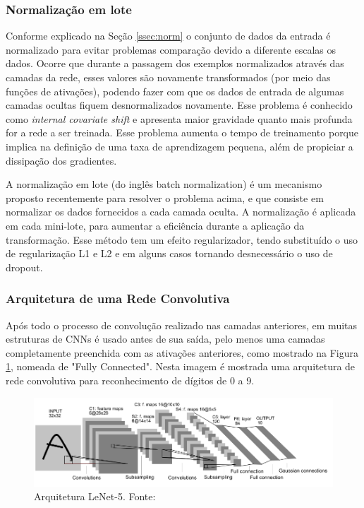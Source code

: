 \subsubsection{Normalização em lote}

Conforme explicado na Seção \ref{ssec:norm} o conjunto de dados da entrada é normalizado para evitar problemas comparação devido a diferente escalas os dados. Ocorre que durante a passagem dos exemplos normalizados através das camadas da rede, esses valores são novamente transformados (por meio das funções de ativações), podendo fazer com que os dados de entrada de algumas camadas ocultas fiquem desnormalizados novamente. Esse problema é conhecido como \textit{internal covariate shift} e apresenta maior gravidade quanto mais profunda for a rede a ser treinada. Esse problema aumenta o tempo de treinamento porque implica na definição de uma taxa de aprendizagem pequena, além de propiciar a dissipação dos gradientes.

A normalização em lote (do inglês batch normalization) é um mecanismo proposto recentemente para resolver o problema acima, e que consiste em normalizar os dados fornecidos a cada camada oculta. A normalização é aplicada em cada mini-lote, para
aumentar a eficiência durante a aplicação da transformação. Esse método tem um efeito regularizador, tendo substituído o uso de regularização L1 e L2 e em alguns casos tornando desnecessário o uso de dropout.

\subsubsection{Arquitetura de uma Rede Convolutiva}

Após todo o processo de convolução realizado nas camadas anteriores, em muitas estruturas de CNNs é usado antes de sua saída, pelo menos uma camadas completamente preenchida com as ativações anteriores, como mostrado na Figura \ref{fig-alexnet}, nomeada de "Fully Connected". Nesta imagem é mostrada uma arquitetura de rede convolutiva para reconhecimento de dígitos de 0 a 9.

\begin{figure}[H]
	\centering
	\includegraphics[scale=0.4]{pasta1_figuras/alexnet.png}
	\caption {Arquitetura LeNet-5. Fonte: \cite{lecun98}}
	\label{fig-alexnet}
\end{figure}

